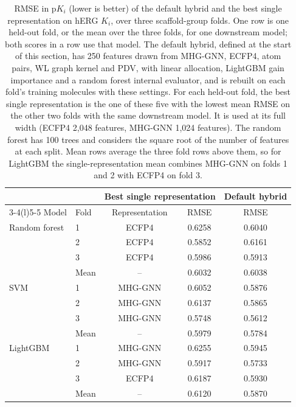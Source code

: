 \begin{table}[htbp]
\centering
\small
\begin{tabular}{@{}llccc@{}}
\toprule
 & & \multicolumn{2}{c}{Best single representation} & Default hybrid \\
\cmidrule(lr){3-4}\cmidrule(l){5-5}
Model & Fold & Representation & RMSE & RMSE \\
\midrule
Random forest & 1 & ECFP4 & 0.6258 & 0.6040 \\
 & 2 & ECFP4 & 0.5852 & 0.6161 \\
 & 3 & ECFP4 & 0.5986 & 0.5913 \\
 & Mean & -- & 0.6032 & 0.6038 \\
\addlinespace
SVM & 1 & MHG-GNN & 0.6052 & 0.5876 \\
 & 2 & MHG-GNN & 0.6137 & 0.5865 \\
 & 3 & MHG-GNN & 0.5748 & 0.5612 \\
 & Mean & -- & 0.5979 & 0.5784 \\
\addlinespace
LightGBM & 1 & MHG-GNN & 0.6255 & 0.5945 \\
 & 2 & MHG-GNN & 0.5917 & 0.5733 \\
 & 3 & ECFP4 & 0.6187 & 0.5930 \\
 & Mean & -- & 0.6120 & 0.5870 \\
\bottomrule
\end{tabular}
\caption[Default hybrid and best single representation on hERG $K_i$.]{RMSE in p$K_i$ (lower is better) of the default hybrid and the best single representation on hERG $K_i$, over three scaffold-group folds. One row is one held-out fold, or the mean over the three folds, for one downstream model; both scores in a row use that model. The default hybrid, defined at the start of this section, has 250 features drawn from MHG-GNN, ECFP4, atom pairs, WL graph kernel and PDV, with linear allocation, LightGBM gain importance and a random forest internal evaluator, and is rebuilt on each fold's training molecules with these settings. For each held-out fold, the best single representation is the one of these five with the lowest mean RMSE on the other two folds with the same downstream model. It is used at its full width (ECFP4 2,048 features, MHG-GNN 1,024 features). The random forest has 100 trees and considers the square root of the number of features at each split. Mean rows average the three fold rows above them, so for LightGBM the single-representation mean combines MHG-GNN on folds 1 and 2 with ECFP4 on fold 3.}
\label{tab:prelim_default_vs_single}
\end{table}

